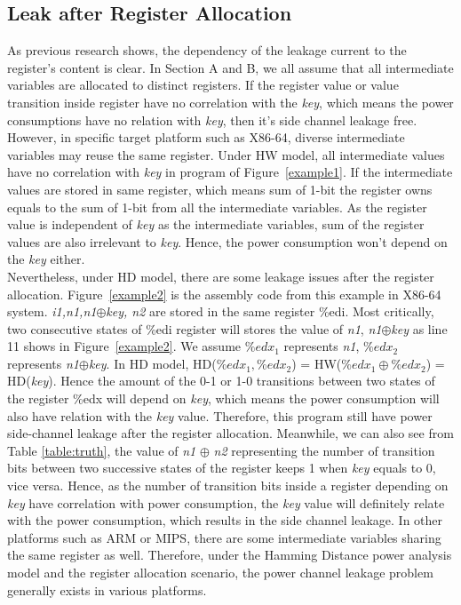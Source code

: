 \documentclass[10pt, conference]{IEEEtran}
\begin{document}
 \subsection{Leak after Register Allocation}
As previous research shows, the dependency of the leakage current to the register's content is clear. In Section A and B, we all assume that all intermediate variables are allocated to distinct registers. If the register value or value transition inside register have no correlation with the \emph{key}, which means the power consumptions have no relation with \emph{key}, then it's side channel leakage free. However, in specific target platform such as X86-64, diverse intermediate variables may reuse the same register. Under HW model, all intermediate values have no correlation with \emph{key} in program of Figure~\ref{example1}. If the intermediate values are stored in same register, which means sum of 1-bit the register owns equals to the sum of 1-bit from all the intermediate variables. As the register value is independent of \emph{key} as the intermediate variables, sum of the register values are also irrelevant to \emph{key}. Hence, the power consumption won't depend on the \emph{key} either.
\\
Nevertheless, under HD model, there are some leakage issues after the register allocation. Figure~\ref{example2} is the assembly code from this example in X86-64 system. \emph{i1,n1,n1$\oplus$key, n2} are stored in the same register \%edi. Most critically, two consecutive states of \%edi register will stores the value of \emph{n1}, \emph{n1$\oplus$key} as line 11 shows in Figure~\ref{example2}. We assume ${\%edx}_{1}$ represents \emph{n1}, ${\%edx}_{2}$ represents \emph{n1$\oplus$key}. In HD model, HD(${\%edx}_{1}, {\%edx}_{2}$) = HW(${\%edx}_{1} \oplus {\%edx}_{2}$) = HD(\emph{key}). Hence the amount of the 0-1 or 1-0 transitions between two states of the register \%edx will depend on \emph{key}, which means the power consumption will also have relation with the \emph{key} value. Therefore, this program still have power side-channel leakage after the register allocation. Meanwhile, we can also see from Table \ref{table:truth}, the value of \emph{n1} $\oplus$ \emph{n2} representing the number of transition bits between two successive states of the register keeps 1 when \emph{key} equals to 0, vice versa. Hence, as the number of transition bits inside a register depending on \emph{key} have correlation with power consumption, the \emph{key} value will definitely relate with the power consumption, which results in the side channel leakage. In other platforms such as ARM or MIPS, there are some intermediate variables sharing the same register as well. Therefore, under the Hamming Distance power analysis model and the register allocation scenario, the power channel leakage problem generally exists in various platforms.
\end{document}
